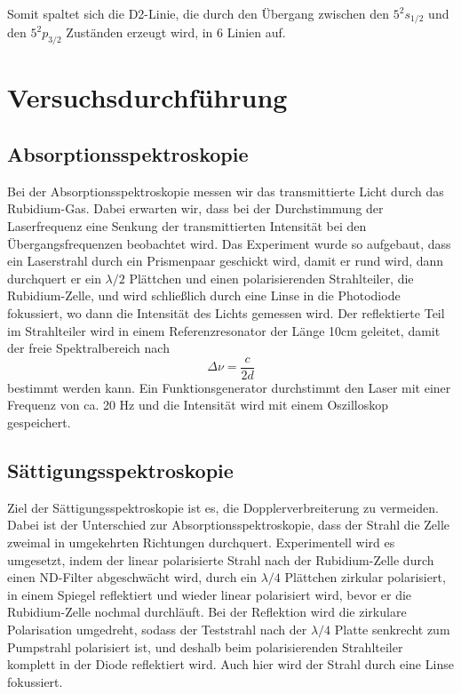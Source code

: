 \documentclass[a4paper,parskip]{scrartcl}
\begin{document}
Somit spaltet sich die D2-Linie, die durch den Übergang zwischen den $5^2s_{1/2}$ und den $5^2p_{3/2}$ Zuständen erzeugt wird, in 6 Linien auf.

\section{Versuchsdurchführung}

\subsection{Absorptionsspektroskopie}

 Bei der Absorptionsspektroskopie messen wir das transmittierte Licht durch das Rubidium-Gas. Dabei erwarten wir, dass bei der Durchstimmung der Laserfrequenz eine Senkung der transmittierten Intensität bei den Übergangsfrequenzen beobachtet wird. Das Experiment wurde so aufgebaut, dass ein Laserstrahl durch ein Prismenpaar geschickt wird, damit er rund wird, dann durchquert er ein $\lambda /2$ Plättchen und einen polarisierenden Strahlteiler, die Rubidium-Zelle, und wird schließlich durch eine Linse in die Photodiode fokussiert, wo dann die Intensität des Lichts gemessen wird. Der reflektierte Teil im Strahlteiler wird in einem Referenzresonator der Länge 10cm geleitet, damit der freie Spektralbereich nach 
\begin{equation}
	\Delta \nu = \frac{c}{2d}
	\label{Spektralbereich}
\end{equation}
bestimmt werden kann.
Ein Funktionsgenerator durchstimmt den Laser mit einer Frequenz von ca. 20 Hz und die Intensität wird mit einem Oszilloskop gespeichert.

\subsection{Sättigungsspektroskopie}

Ziel der Sättigungsspektroskopie ist es, die Dopplerverbreiterung zu vermeiden. Dabei ist der Unterschied zur Absorptionsspektroskopie, dass der Strahl die Zelle zweimal in umgekehrten Richtungen durchquert. Experimentell wird es umgesetzt, indem der linear polarisierte Strahl nach der Rubidium-Zelle durch einen ND-Filter abgeschwächt wird, durch ein $\lambda/4$ Plättchen zirkular polarisiert, in einem Spiegel reflektiert und wieder linear polarisiert wird, bevor er die Rubidium-Zelle nochmal durchläuft. Bei der Reflektion wird die zirkulare Polarisation umgedreht, sodass der Teststrahl nach der $\lambda/4$ Platte senkrecht zum Pumpstrahl polarisiert ist, und deshalb beim polarisierenden Strahlteiler komplett in der Diode reflektiert wird. Auch hier wird der Strahl durch eine Linse fokussiert.
\end{document}
